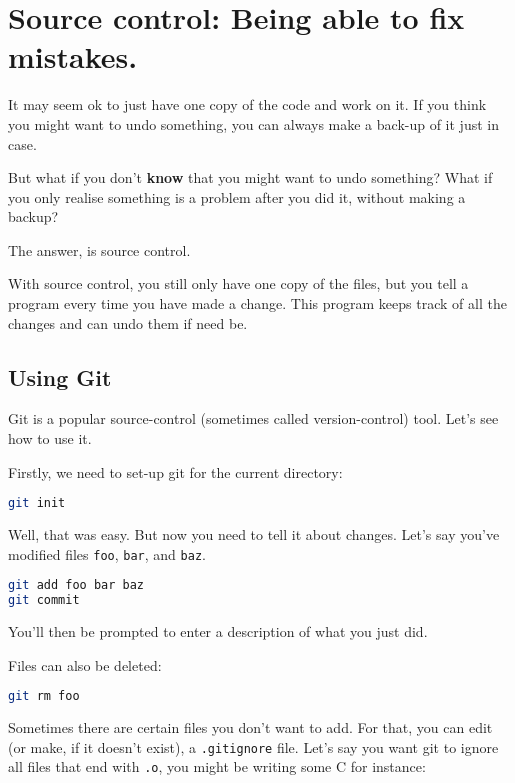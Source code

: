 \documentclass[12pt,a4paper]{article}
\begin{document}
\pagebreak
\section{Source control: Being able to fix mistakes.}

It may seem ok to just have one copy of the code and work on it. If
you think you might want to undo something, you can always make a
back-up of it just in case.

But what if you don't \textbf{know} that you might want to undo
something? What if you only realise something is a problem after you
did it, without making a backup?

The answer, is source control.

With source control, you still only have one copy of the files, but
you tell a program every time you have made a change. This program
keeps track of all the changes and can undo them if need be.

\subsection{Using Git}

Git is a popular source-control (sometimes called version-control)
tool. Let's see how to use it.

Firstly, we need to set-up git for the current directory:

\begin{lstlisting}[language=bash]
git init
\end{lstlisting}

Well, that was easy. But now you need to tell it about changes. Let's
say you've modified files \texttt{foo}, \texttt{bar}, and
\texttt{baz}.

\begin{lstlisting}[language=bash]
git add foo bar baz
git commit
\end{lstlisting}

You'll then be prompted to enter a description of what you just did.

Files can also be deleted:

\begin{lstlisting}[language=bash]
git rm foo
\end{lstlisting}

Sometimes there are certain files you don't want to add. For that, you
can edit (or make, if it doesn't exist), a \texttt{.gitignore}
file. Let's say you want git to ignore all files that end with
\texttt{.o}, you might be writing some C for instance:
\end{document}
